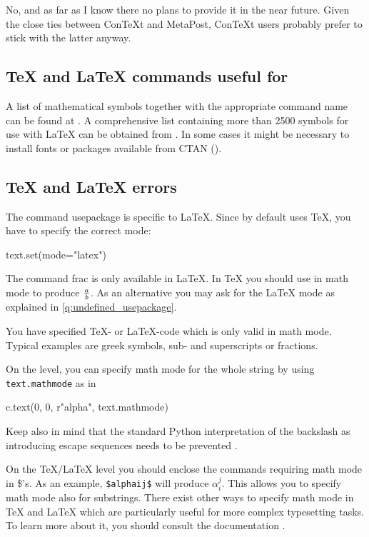 \documentclass[11pt,DIV14]{scrartcl}
\begin{document}
{}
{No, and as far as I know there no plans to provide it in the near future. 
Given the close ties between Con\TeX{}t and Meta\-Post, Con\TeX{}t users 
probably prefer to stick with the latter anyway.
}

\subsection{\TeX{} and \LaTeX{} commands useful for \PyX}

{}
{A list of mathematical symbols together with the appropriate command name
can be found at . A comprehensive list
containing more than 2500 symbols for use with \LaTeX{} can be obtained from 
. In some cases it might be 
necessary to install fonts or packages available from CTAN 
().
}

\subsection{\TeX{} and \LaTeX{} errors}

{}
{\label{q:undefined_usepackage}
The command \cs usepackage is specific to \LaTeX{}. Since by default \PyX{}
uses \TeX{}, you have to specify the correct mode:
\begin{progcode}
text.set(mode="latex")
\end{progcode}
}

{}
{\label{q:undefined_frac}
The command \cs frac is only available in \LaTeX{}. In \TeX{} you should
use \texttt{} in math mode to produce ${a\over b}$. As an 
alternative you may ask for the \LaTeX{} mode as explained in 
\ref{q:undefined_usepackage}.
}

{}
{You have specified \TeX- or \LaTeX-code which is only valid in math mode. 
Typical examples are greek symbols, sub- and superscripts or fractions. 

On the \PyX{} level, you can specify math mode for the whole string by using
\texttt{text.mathmode} as in
\begin{progcode}
c.text(0, 0, r"{\cs alpha}", text.mathmode)
\end{progcode}
Keep also in mind that the standard Python interpretation of the backslash as 
introducing escape sequences needs to be prevented 
.

On the \TeX/\LaTeX{} level you should enclose the commands requiring math
mode in \$'s. As an example, \texttt{\$\cs alpha\us i\hat j\$} will produce 
$\alpha_i^j$. This allows you to specify math mode also for substrings. There 
exist other ways to specify math mode in \TeX{} and \LaTeX{} which are 
particularly useful for more complex typesetting tasks. To learn more about 
it, you should consult the documentation 
. 
}
\end{document}
